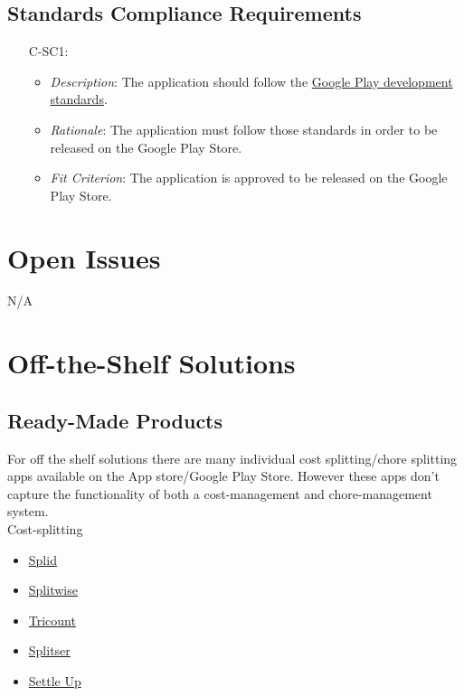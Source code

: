 \documentclass[12pt]{article}
\begin{document}
\subsection{Standards Compliance Requirements}
\noindent \begin{itemize}
    \item[C-SC1:] 
        \begin{itemize}
            \item \textit{Description}: The application should follow the \href{https://play.google.com/about/developer-content-policy/}{Google Play development standards}.
            \item \textit{Rationale}: The application must follow those standards in order to be released on the Google Play Store.
            \item \textit{Fit Criterion}: The application is approved to be released on the Google Play Store.
        \end{itemize}
\end{itemize}

\section{Open Issues}
N/A

\section{Off-the-Shelf Solutions}
\subsection{Ready-Made Products}
For off the shelf solutions there are many individual cost splitting/chore splitting apps available on the App store/Google Play Store. However these apps don't capture the functionality of both a cost-management and chore-management system.\\

Cost-splitting
\begin{itemize}
    \item \href{https://play.google.com/store/apps/details?id=splid.teamturtle.com.splid&hl=en&gl=US}{Splid}
    \item \href{https://www.splitwise.com/}{Splitwise}
    \item \href{https://www.tricount.com/en/mobile}{Tricount}
    \item \href{https://splitser.com/}{Splitser}
    \item \href{https://settleup.io/}{Settle Up}
\end{itemize}
\end{document}
